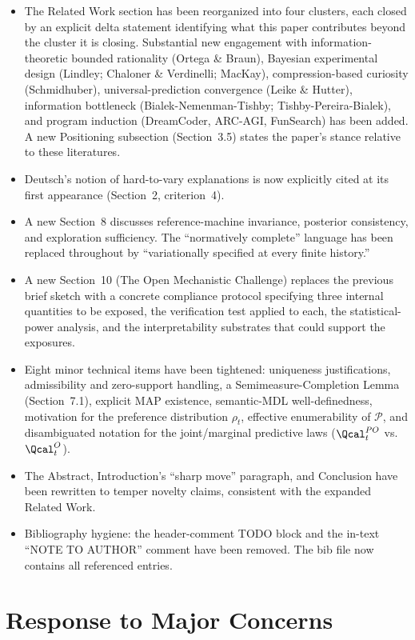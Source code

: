 \documentclass[11pt]{article}
\begin{document}
\begin{itemize}
\item The Related Work section has been reorganized into four clusters, each closed by an explicit delta statement identifying what this paper contributes beyond the cluster it is closing. Substantial new engagement with information-theoretic bounded rationality (Ortega \& Braun), Bayesian experimental design (Lindley; Chaloner \& Verdinelli; MacKay), compression-based curiosity (Schmidhuber), universal-prediction convergence (Leike \& Hutter), information bottleneck (Bialek-Nemenman-Tishby; Tishby-Pereira-Bialek), and program induction (DreamCoder, ARC-AGI, FunSearch) has been added. A new Positioning subsection (Section~3.5) states the paper's stance relative to these literatures.
\item Deutsch's notion of hard-to-vary explanations is now explicitly cited at its first appearance (Section~2, criterion~4).
\item A new Section~8 discusses reference-machine invariance, posterior consistency, and exploration sufficiency. The ``normatively complete'' language has been replaced throughout by ``variationally specified at every finite history.''
\item A new Section~10 (The Open Mechanistic Challenge) replaces the previous brief sketch with a concrete compliance protocol specifying three internal quantities to be exposed, the verification test applied to each, the statistical-power analysis, and the interpretability substrates that could support the exposures.
\item Eight minor technical items have been tightened: uniqueness justifications, admissibility and zero-support handling, a Semimeasure-Completion Lemma (Section~7.1), explicit MAP existence, semantic-MDL well-definedness, motivation for the preference distribution $\rho_t$, effective enumerability of $\mathcal{P}$, and disambiguated notation for the joint/marginal predictive laws ($\Qcal_t^{PO}$ vs.\ $\Qcal_t^O$).
\item The Abstract, Introduction's ``sharp move'' paragraph, and Conclusion have been rewritten to temper novelty claims, consistent with the expanded Related Work.
\item Bibliography hygiene: the header-comment TODO block and the in-text ``NOTE TO AUTHOR'' comment have been removed. The bib file now contains all referenced entries.
\end{itemize}

\section*{Response to Major Concerns}
\end{document}
